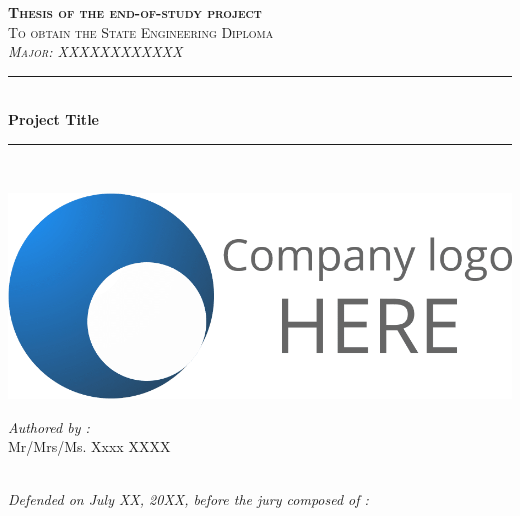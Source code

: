 \vspace{0.9cm}
\begin{center}
{\large \textsc{\textbf{Thesis of the end-of-study project}}}\\[0.1cm]
{\large \textsc{To obtain the State Engineering Diploma}}\\[0.1cm]
{\large \textsc{\textit{Major: XXXXXXXXXXXX}}} \\[0.05cm] 
\vspace{-0.04cm}
\rule{\linewidth}{0.3mm} \\[0.4cm]   %
 { \huge \textbf{ Project Title }} \\[0.15cm] 
\rule{\linewidth}{0.3mm} \\[0.4cm]
\vspace{0.4cm}

\includegraphics[scale=0.075]{Logos/Company_Logo_Expl.png}  %

\vspace{1cm}

\noindent
\begin{minipage}{0.9\textwidth}
    \vspace{-7mm}
  \begin{flushleft} \large
    \emph{Authored by :}\\
    Mr/Mrs/Ms. Xxxx \textsc{XXXX} %
  \end{flushleft}
\end{minipage}
\begin{minipage}{0.4\textwidth}

\end{minipage}\\[0.6cm]

{\large \textit{Defended on July XX, 20XX, before the jury composed of :}}\\[0.5cm]



\end{center}

